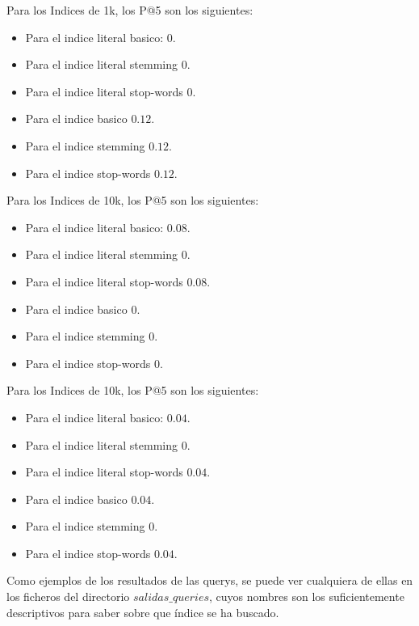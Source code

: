 \documentclass[palatino,nochap]{apuntes}
\begin{document}
Para los Indices de 1k, los P@5 son los siguientes:
\begin{itemize}
\item Para el indice literal basico: $0$.
\item Para el indice literal stemming $0$.
\item Para el indice literal stop-words $0$.
\item Para el indice basico $0.12$.
\item Para el indice stemming $0.12$.
\item Para el indice stop-words $0.12$.
\end{itemize}


Para los Indices de 10k, los P@5 son los siguientes:
\begin{itemize}
	\item Para el indice literal basico: $0.08$.
	\item Para el indice literal stemming $0$.
	\item Para el indice literal stop-words $0.08$.
	\item Para el indice basico $0$.
	\item Para el indice stemming $0$.
	\item Para el indice stop-words $0$.
\end{itemize}


Para los Indices de 10k, los P@5 son los siguientes:
\begin{itemize}
	\item Para el indice literal basico: $0.04$.
	\item Para el indice literal stemming $0$.
	\item Para el indice literal stop-words $0.04$.
	\item Para el indice basico $0.04$.
	\item Para el indice stemming $0$.
	\item Para el indice stop-words $0.04$.
\end{itemize}


Como ejemplos de los resultados de las querys, se puede ver cualquiera de ellas en los ficheros del directorio $salidas\_queries$, cuyos nombres son los suficientemente descriptivos para saber sobre que índice se ha buscado.
\end{document}
